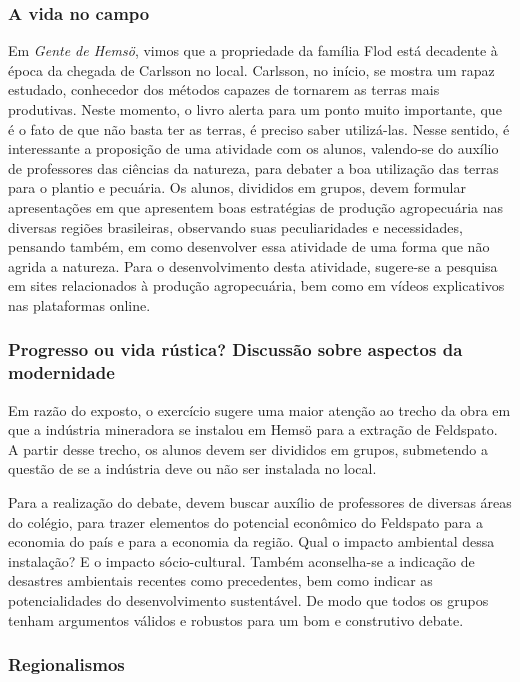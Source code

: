 \documentclass[12pt]{extarticle}
\begin{document}
\subsubsection{A vida no campo}


Em \emph{Gente de Hemsö}, vimos que a propriedade da família Flod está
decadente à época da chegada de Carlsson no local. Carlsson, no
início, se mostra um rapaz estudado, conhecedor dos métodos capazes de
tornarem as terras mais produtivas. Neste momento, o livro alerta para
um ponto muito importante, que é o fato de que não basta ter as
terras, é preciso saber utilizá-las. Nesse sentido, é interessante a
proposição de uma atividade com os alunos, valendo-se do auxílio de
professores das ciências da natureza, para debater a boa utilização
das terras para o plantio e pecuária. Os alunos, divididos em grupos,
devem formular apresentações em que apresentem boas estratégias de
produção agropecuária nas diversas regiões brasileiras, observando
suas peculiaridades e necessidades, pensando também, em como
desenvolver essa atividade de uma forma que não agrida a natureza.
Para o desenvolvimento desta atividade, sugere-se a pesquisa em sites
relacionados à produção agropecuária, bem como em vídeos explicativos
nas plataformas online.

\subsubsection{Progresso ou vida rústica? Discussão sobre aspectos da modernidade}


Em razão do exposto, o exercício sugere uma maior atenção ao trecho da
obra em que a indústria mineradora se instalou em Hemsö para a
extração de Feldspato. A partir desse trecho, os alunos devem ser
divididos em grupos, submetendo a questão de se a indústria deve ou
não ser instalada no local.

Para a realização do debate, devem buscar auxílio de professores de
diversas áreas do colégio, para trazer elementos do potencial econômico
do Feldspato para a economia do país e para a economia da região. Qual o
impacto ambiental dessa instalação? E o impacto sócio-cultural. Também
aconselha-se a indicação de desastres ambientais recentes como
precedentes, bem como indicar as potencialidades do desenvolvimento
sustentável. De modo que todos os grupos tenham argumentos válidos e
robustos para um bom e construtivo debate.

\subsubsection{Regionalismos}
\end{document}
